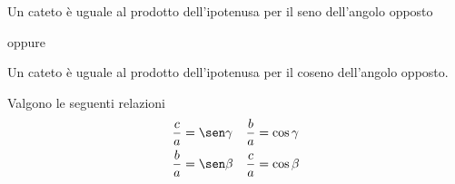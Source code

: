 Un cateto è uguale  al prodotto dell'ipotenusa per il seno dell'angolo opposto

oppure

Un cateto è uguale al prodotto dell'ipotenusa per il coseno dell'angolo opposto.

Valgono le seguenti relazioni
\begin{align*}
\dfrac{c}{a}&=\sen\gamma&\dfrac{b}{a}&=\cos\gamma\\
\dfrac{b}{a}&=\sen\beta&\dfrac{c}{a}&=\cos\beta
\end{align*}
